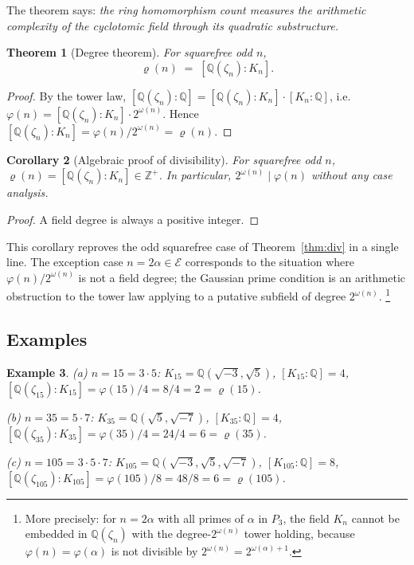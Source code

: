 \documentclass[12pt]{amsart}
\theoremstyle{bluehead}
\newtheorem{theorem}{Theorem}[section]
\newtheorem{corollary}[theorem]{Corollary}
\theoremstyle{orangehead}
\newtheorem{example}[theorem]{Example}
\theoremstyle{greenhead}
\newcommand{\Z}{\mathbb{Z}}
\newcommand{\Q}{\mathbb{Q}}
\renewcommand{\phi}{\varphi}
\newcommand{\Exc}{\mathcal{E}}
\begin{document}
The theorem says: \emph{the ring homomorphism count measures the
arithmetic complexity of the cyclotomic field through its quadratic
substructure.}

\begin{theorem}[Degree theorem]\label{thm:degree}
  For squarefree odd $n$,
  \[
    \varrho(n)\;=\;[\Q(\zeta_n):K_n].
  \]
\end{theorem}

\begin{proof}
By the tower law,
$[\Q(\zeta_n):\Q]=[\Q(\zeta_n):K_n]\cdot[K_n:\Q]$,
i.e.\ $\phi(n)=[\Q(\zeta_n):K_n]\cdot2^{\omega(n)}$.
Hence $[\Q(\zeta_n):K_n]=\phi(n)/2^{\omega(n)}=\varrho(n)$.
\qedhere
\end{proof}

\begin{corollary}[Algebraic proof of divisibility]\label{cor:tower}
  For squarefree odd $n$, $\varrho(n)=[\Q(\zeta_n):K_n]\in\Z^+$.
  In particular, $2^{\omega(n)}\mid\phi(n)$ without any case analysis.
\end{corollary}

\begin{proof}
  A field degree is always a positive integer.
\qedhere
\end{proof}

This corollary reproves the odd squarefree case of
Theorem~\ref{thm:div} in a single line.
The exception case $n=2\alpha\in\Exc$ corresponds to the situation where
$\phi(n)/2^{\omega(n)}$ is not a field degree; the Gaussian prime condition
is an arithmetic obstruction to the tower law applying to a putative
subfield of degree $2^{\omega(n)}$.%
\footnote{More precisely: for $n=2\alpha$ with all primes of $\alpha$
  in $P_3$, the field $K_n$ cannot be embedded in $\Q(\zeta_n)$ with the
  degree-$2^{\omega(n)}$ tower holding, because $\phi(n)=\phi(\alpha)$
  is not divisible by $2^{\omega(n)}=2^{\omega(\alpha)+1}$.}

\subsection*{Examples}

\begin{example}\label{ex:cyclo}
  (a) $n=15=3\cdot5$: $K_{15}=\Q(\sqrt{-3},\sqrt{5})$,
  $[K_{15}:\Q]=4$, $[\Q(\zeta_{15}):K_{15}]=\phi(15)/4=8/4=2=\varrho(15)$.

  (b) $n=35=5\cdot7$: $K_{35}=\Q(\sqrt{5},\sqrt{-7})$,
  $[K_{35}:\Q]=4$, $[\Q(\zeta_{35}):K_{35}]=\phi(35)/4=24/4=6=\varrho(35)$.

  (c) $n=105=3\cdot5\cdot7$: $K_{105}=\Q(\sqrt{-3},\sqrt{5},\sqrt{-7})$,
  $[K_{105}:\Q]=8$, $[\Q(\zeta_{105}):K_{105}]=\phi(105)/8=48/8=6=\varrho(105)$.
\end{example}
\end{document}

